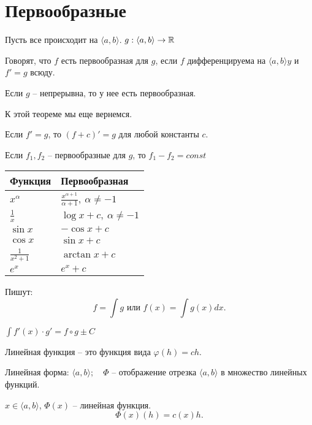 \documentclass[12pt]{report}
\begin{document}
\section{Первообразные}
Пусть все происходит на $ \langle a, b \rangle$. $ g : \langle a, b \rangle \to  \mathbb{R}$
\begin{defn}
    Говорят, что $ f$ есть первообразная для $ g$, если $ f$ дифференцируема на $ \langle a, b \rangle y$ и $ f' = g$ всюду. 
\end{defn}
\begin{thm}
    Если $ g$ -- непрерывна, то у нее есть первообразная.
\end{thm}
\begin{note}
    К этой теореме мы еще вернемся.
\end{note}
\begin{st}
    Если $ f' = g$, то $ (f + c)' = g$ для любой константы  $ c$.
\end{st}
\begin{thm}
    Если $ f_1, f_2$ -- первообразные для $ g$, то $ f_1 - f_2 = const$
\end{thm}
\renewcommand{\arraystretch}{1.5}
\begin{tabular}[ht]{|l|l|}
    \hline
    Функция & Первообразная \\
    \hline
    $ x^{ \alpha }$ & $ \frac{x^{ \alpha + 1}}{\alpha + 1}, ~ \alpha \ne -1$\\
    \hline
    $ \frac{1}{x}$ & $ \log x + c, ~ \alpha \ne -1$ \\
    \hline
    $ \sin x$ & $ -\cos x + c$\\
    \hline
    $ \cos x$ & $ \sin x + c$\\
    \hline
    $ \frac{1}{x^2+1}$ & $ \arctan x + c$\\
    \hline
     $ e^{x}$ & $ e^{x} + c$ \\
     \hline
\end{tabular}
\begin{name}
    Пишут: \[
	f = \int g \text{ или } f(x) = \int g(x) dx
    .\] 
\end{name}
\begin{st}
    $ \int f'(x) \cdot g' = f \circ g \pm C$
\end{st}
\begin{defn}
    Линейная функция -- это функция вида $ \varphi  (h) = ch$.

    Линейная форма: 
    $\langle a, b \rangle; \quad \Phi $ -- отображение отрезка $ \langle a, b \rangle$ в множество линейных функций.

    $ x \in  \langle a, b \rangle$, $ \Phi(x) $ -- линейная функция.
    \[
	\Phi(x)(h) = c (x) h
    .\] 
\end{defn}
\end{document}
